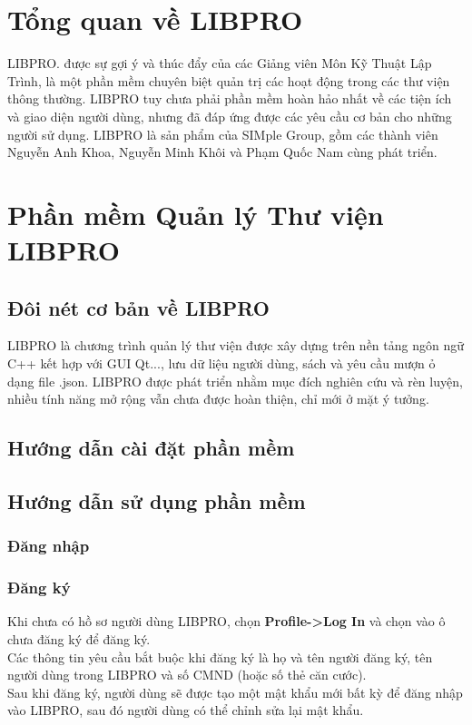 \documentclass[12pt,a4paper]{report}
\begin{document}
\chapter{Tổng quan về LIBPRO}
LIBPRO. được sự gợi ý và thúc đẩy của các Giảng viên Môn Kỹ Thuật Lập Trình, là một phần mềm chuyên biệt quản trị các hoạt động trong các thư viện thông thường. LIBPRO tuy chưa phải phần mềm hoàn hảo nhất về các tiện ích và giao diện người dùng, nhưng đã đáp ứng được các yêu cầu cơ bản cho những người sử dụng. LIBPRO là sản phẩm của SIMple Group, gồm các thành viên Nguyễn Anh Khoa, Nguyễn Minh Khôi và Phạm Quốc Nam cùng phát triển.
\chapter{Phần mềm Quản lý Thư viện LIBPRO}
	\section{Đôi nét cơ bản về LIBPRO}
	LIBPRO là chương trình quản lý thư viện được xây dựng trên nền tảng ngôn ngữ C++ kết hợp với GUI Qt..., lưu dữ liệu người dùng, sách và yêu cầu mượn ỏ dạng file .json. LIBPRO được phát triển nhằm mục đích nghiên cứu và rèn luyện, nhiều tính năng mở rộng vẫn chưa được hoàn thiện, chỉ mới ở mặt ý tưởng.
	\section{Hướng dẫn cài đặt phần mềm}
	\section{Hướng dẫn sử dụng phần mềm}
		\subsection{Đăng nhập}
			\subsection{Đăng ký}
			Khi chưa có hồ sơ người dùng LIBPRO, chọn \textbf{Profile->Log In} và chọn vào ô chưa đăng ký để đăng ký.\\
			Các thông tin yêu cầu bắt buộc khi đăng ký là họ và tên người đăng ký, tên người dùng trong LIBPRO và số CMND (hoặc số thẻ căn cước).\\
			Sau khi đăng ký, người dùng sẽ được tạo một mật khẩu mới bất kỳ để đăng nhập vào LIBPRO, sau đó người dùng có thể chỉnh sửa lại mật khẩu.\\
\end{document}
